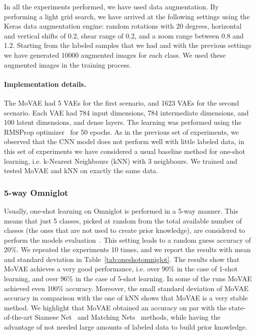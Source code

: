 \documentclass[sigconf,authorversion=true]{aamas}  %
\begin{document}
In all the experiments performed, we have used data augmentation. By performing a light grid search, we have arrived at the following settings using the Keras data augmentation engine: random rotations with 20 degrees, horizontal and vertical shifts of 0.2, shear range of 0.2, and a zoom range between 0.8 and 1.2. Starting from the labeled samples that we had and with the previous settings we have generated 10000 augmented images for each class. We used these augmented images in the training process.

\paragraph{Implementation details.} The MoVAE had 5 VAEs for the first scenario, and 1623 VAEs for the second scenario. Each VAE had 784 input dimensions, 784 intermediate dimensions, and 100 latent dimensions, and dense layers. The learning was performed using the RMSProp optimizer~\cite{rmsproptraining} for 50 epochs. As in the previous set of experiments, we observed that the CNN model does not perform well with little labeled data, in this set of experiments we have considered a usual baseline method for one-shot learning, i.e. k-Nearest Neighbours (kNN) with 3 neighbours. We trained and tested MoVAE and kNN on exactly the same data.

\subsubsection{5-way Omniglot}

Usually, one-shot learning on Omniglot is performed in a 5-way manner. This means that just 5 classes, picked at random from the total available number of classes (the ones that are not used to create prior knowledge), are considered to perform the models evaluation~\cite{VinyalsBLKW16}. This setting leads to a random guess accuracy of 20\%. We repeated the experiments 10 times, and we report the results with mean and standard deviation in Table~\ref{tab:oneshotomniglot}. The results show that MoVAE achieves a very good performance, i.e. over 90\% in the case of 1-shot learning, and over 96\% in the case of 5-shot learning. In some of the runs MoVAE achieved even 100\% accuracy. Moreover, the small standard deviation of MoVAE accuracy in comparison with the one of kNN shows that MoVAE is a very stable method. We highlight that MoVAE obtained an accuracy on par with the state-of-the-art Siamese Net~\cite{Koch2015SiameseNN} and Matching Nets~\cite{VinyalsBLKW16} methods, while having the advantage of not needed large amounts of labeled data to build prior knowledge.
\end{document}
